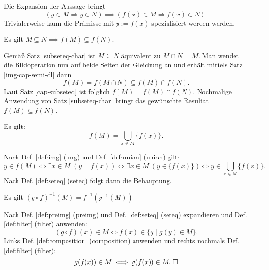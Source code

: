 \begin{Beweis}[Beweis\;2]
Die Expansion der Aussage bringt
\[(y\in M\Rightarrow y\in N)\implies (f(x)\in M\Rightarrow f(x)\in N).\]
Trivialerweise kann die Prämisse mit $y:=f(x)$ spezialisiert
werden werden.\;\qedsymbol
\end{Beweis}

\begin{Satz}
Es gilt $M\subseteq N\implies f(M)\subseteq f(N)$.
\end{Satz}
\begin{Beweis}
Gemäß Satz \ref{subseteq-char} ist $M\subseteq N$ äquivalent zu
$M\cap N=M$. Man wendet die Bildoperation nun auf beide Seiten
der Gleichung an und erhält mittels Satz \ref{img-cap-semi-dl}
dann%
\[f(M) = f(M\cap N)\subseteq f(M)\cap f(N).\]
Laut Satz \ref{cap-subseteq} ist folglich $f(M)=f(M)\cap f(N)$.
Nochmalige Anwendung von Satz \ref{subseteq-char} bringt das
gewünschte Resultat $f(M)\subseteq f(N)$.\;\qedsymbol
\end{Beweis}

\begin{Satz}\label{img-as-cup}
Es gilt:
\[f(M) = \bigcup_{x\in M} \{f(x)\}.\]
\end{Satz}

\begin{Beweis}
Nach Def. \ref{def:img} (img) und Def. \ref{def:union} (union) gilt:
\[y\in f(M) \iff \exists x{\in}M\;(y=f(x))
\iff \exists x{\in}M\;(y\in \{f(x)\})
\iff y\in\bigcup_{x\in M}\{f(x)\}.\]
Nach Def. \ref{def:seteq} (seteq) folgt dann die Behauptung.\,\qedsymbol
\end{Beweis}

\begin{Satz}
Es gilt $(g\circ f)^{-1}(M) = f^{-1}(g^{-1}(M))$.
\end{Satz}
\begin{Beweis}
Nach Def. \ref{def:preimg} (preimg) und Def. \ref{def:seteq} (seteq)
expandieren und Def. \ref{def:filter} (filter) anwenden:%
\[(g\circ f)(x)\in M \iff f(x)\in\{y\mid g(y)\in M\}.\]
Links Def. \ref{def:composition} (composition) anwenden und rechts
nochmals Def. \ref{def:filter} (filter):%
\[g(f(x))\in M \iff g(f(x))\in M.\;\square\]
\end{Beweis}

